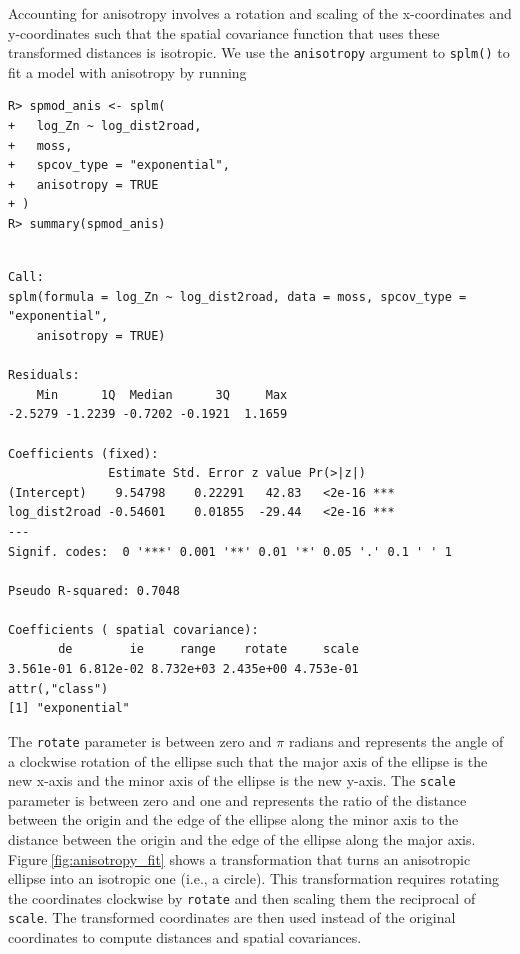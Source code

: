 \documentclass[10pt,letterpaper]{article}
\begin{document}
Accounting for anisotropy involves a rotation and scaling of the
x-coordinates and y-coordinates such that the spatial covariance
function that uses these transformed distances is isotropic. We use the
\texttt{anisotropy} argument to \texttt{splm()} to fit a model with
anisotropy by running

\begin{verbatim}
R> spmod_anis <- splm(
+   log_Zn ~ log_dist2road,
+   moss,
+   spcov_type = "exponential",
+   anisotropy = TRUE
+ )
R> summary(spmod_anis)
\end{verbatim}

\begin{verbatim}

Call:
splm(formula = log_Zn ~ log_dist2road, data = moss, spcov_type = "exponential", 
    anisotropy = TRUE)

Residuals:
    Min      1Q  Median      3Q     Max 
-2.5279 -1.2239 -0.7202 -0.1921  1.1659 

Coefficients (fixed):
              Estimate Std. Error z value Pr(>|z|)    
(Intercept)    9.54798    0.22291   42.83   <2e-16 ***
log_dist2road -0.54601    0.01855  -29.44   <2e-16 ***
---
Signif. codes:  0 '***' 0.001 '**' 0.01 '*' 0.05 '.' 0.1 ' ' 1

Pseudo R-squared: 0.7048

Coefficients ( spatial covariance):
       de        ie     range    rotate     scale 
3.561e-01 6.812e-02 8.732e+03 2.435e+00 4.753e-01 
attr(,"class")
[1] "exponential"
\end{verbatim}

The \texttt{rotate} parameter is between zero and \(\pi\) radians and
represents the angle of a clockwise rotation of the ellipse such that
the major axis of the ellipse is the new x-axis and the minor axis of
the ellipse is the new y-axis. The \texttt{scale} parameter is between
zero and one and represents the ratio of the distance between the origin
and the edge of the ellipse along the minor axis to the distance between
the origin and the edge of the ellipse along the major axis.
Figure\(~\)\ref{fig:anisotropy_fit} shows a transformation that turns an
anisotropic ellipse into an isotropic one (i.e., a circle). This
transformation requires rotating the coordinates clockwise by
\texttt{rotate} and then scaling them the reciprocal of \texttt{scale}.
The transformed coordinates are then used instead of the original
coordinates to compute distances and spatial covariances.
\end{document}
